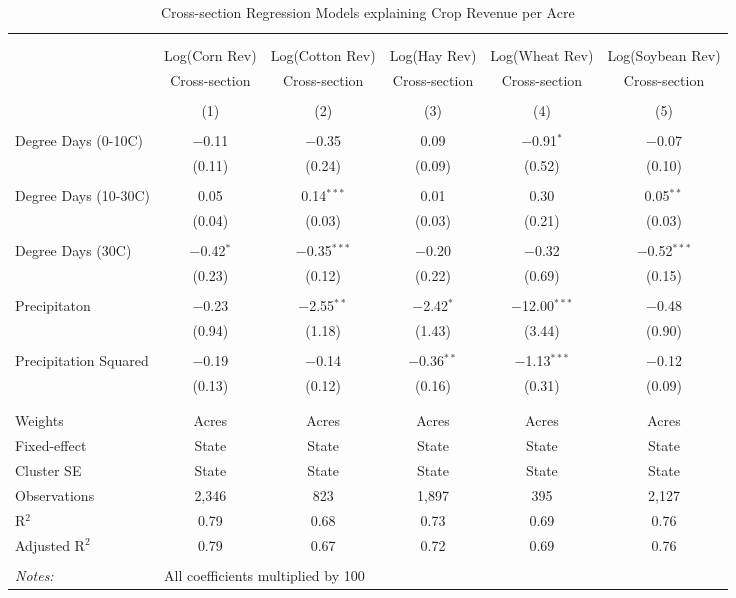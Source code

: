 \documentclass[10pt]{article}
\begin{document}
\begin{table}[!htbp] \centering 
  \caption{Cross-section Regression Models explaining Crop Revenue per Acre} 
  \label{} 
\footnotesize 
\begin{tabular}{@{\extracolsep{5pt}}lccccc} 
\\[-1.8ex]\hline 
\hline \\[-1.8ex] 
\\[-1.8ex] & Log(Corn Rev) & Log(Cotton Rev) & Log(Hay Rev) & Log(Wheat Rev) & Log(Soybean Rev) \\ 
 & Cross-section & Cross-section & Cross-section & Cross-section & Cross-section \\ 
\\[-1.8ex] & (1) & (2) & (3) & (4) & (5)\\ 
\hline \\[-1.8ex] 
 Degree Days (0-10C) & $-$0.11 & $-$0.35 & 0.09 & $-$0.91$^{*}$ & $-$0.07 \\ 
  & (0.11) & (0.24) & (0.09) & (0.52) & (0.10) \\ 
  & & & & & \\ 
 Degree Days (10-30C) & 0.05 & 0.14$^{***}$ & 0.01 & 0.30 & 0.05$^{**}$ \\ 
  & (0.04) & (0.03) & (0.03) & (0.21) & (0.03) \\ 
  & & & & & \\ 
 Degree Days (30C) & $-$0.42$^{*}$ & $-$0.35$^{***}$ & $-$0.20 & $-$0.32 & $-$0.52$^{***}$ \\ 
  & (0.23) & (0.12) & (0.22) & (0.69) & (0.15) \\ 
  & & & & & \\ 
 Precipitaton & $-$0.23 & $-$2.55$^{**}$ & $-$2.42$^{*}$ & $-$12.00$^{***}$ & $-$0.48 \\ 
  & (0.94) & (1.18) & (1.43) & (3.44) & (0.90) \\ 
  & & & & & \\ 
 Precipitation Squared & $-$0.19 & $-$0.14 & $-$0.36$^{**}$ & $-$1.13$^{***}$ & $-$0.12 \\ 
  & (0.13) & (0.12) & (0.16) & (0.31) & (0.09) \\ 
  & & & & & \\ 
\hline \\[-1.8ex] 
Weights & Acres & Acres & Acres & Acres & Acres \\ 
Fixed-effect & State & State & State & State & State \\ 
Cluster SE & State & State & State & State & State \\ 
Observations & 2,346 & 823 & 1,897 & 395 & 2,127 \\ 
R$^{2}$ & 0.79 & 0.68 & 0.73 & 0.69 & 0.76 \\ 
Adjusted R$^{2}$ & 0.79 & 0.67 & 0.72 & 0.69 & 0.76 \\ 
\hline 
\hline \\[-1.8ex] 
\textit{Notes:} & \multicolumn{5}{l}{All coefficients multiplied by 100} \\ 
\end{tabular} 
\end{table} 
\end{document}
